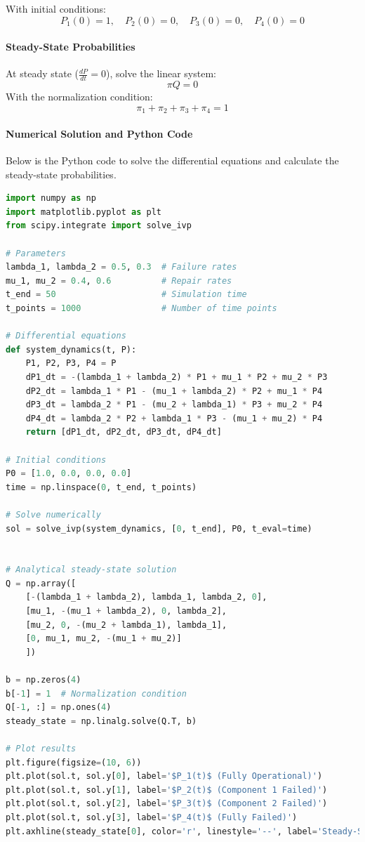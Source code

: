 \documentclass[a4paper,12pt]{article}
\begin{document}
\begin{answerbox}
	With initial conditions:
	\[
	P_1(0) = 1, \quad P_2(0) = 0, \quad P_3(0) = 0, \quad P_4(0) = 0
	\]
	
	\paragraph{Steady-State Probabilities}
	At steady state (\( \frac{dP}{dt} = 0 \)), solve the linear system:
	\[
	\pi Q = 0
	\]
	With the normalization condition:
	\[
	\pi_1 + \pi_2 + \pi_3 + \pi_4 = 1
	\]
\end{answerbox}



\begin{answerbox}
	\paragraph{Numerical Solution and Python Code}
	Below is the Python code to solve the differential equations and calculate the steady-state probabilities.
	
	
\begin{lstlisting}[language=Python]
import numpy as np
import matplotlib.pyplot as plt
from scipy.integrate import solve_ivp

# Parameters
lambda_1, lambda_2 = 0.5, 0.3  # Failure rates
mu_1, mu_2 = 0.4, 0.6          # Repair rates
t_end = 50                     # Simulation time
t_points = 1000                # Number of time points

# Differential equations
def system_dynamics(t, P):
	P1, P2, P3, P4 = P
	dP1_dt = -(lambda_1 + lambda_2) * P1 + mu_1 * P2 + mu_2 * P3
	dP2_dt = lambda_1 * P1 - (mu_1 + lambda_2) * P2 + mu_1 * P4
	dP3_dt = lambda_2 * P1 - (mu_2 + lambda_1) * P3 + mu_2 * P4
	dP4_dt = lambda_2 * P2 + lambda_1 * P3 - (mu_1 + mu_2) * P4
	return [dP1_dt, dP2_dt, dP3_dt, dP4_dt]

# Initial conditions
P0 = [1.0, 0.0, 0.0, 0.0]
time = np.linspace(0, t_end, t_points)

# Solve numerically
sol = solve_ivp(system_dynamics, [0, t_end], P0, t_eval=time)


# Analytical steady-state solution
Q = np.array([
	[-(lambda_1 + lambda_2), lambda_1, lambda_2, 0],
	[mu_1, -(mu_1 + lambda_2), 0, lambda_2],
	[mu_2, 0, -(mu_2 + lambda_1), lambda_1],
	[0, mu_1, mu_2, -(mu_1 + mu_2)]
	])
	
b = np.zeros(4)
b[-1] = 1  # Normalization condition
Q[-1, :] = np.ones(4)
steady_state = np.linalg.solve(Q.T, b)

# Plot results
plt.figure(figsize=(10, 6))
plt.plot(sol.t, sol.y[0], label='$P_1(t)$ (Fully Operational)')
plt.plot(sol.t, sol.y[1], label='$P_2(t)$ (Component 1 Failed)')
plt.plot(sol.t, sol.y[2], label='$P_3(t)$ (Component 2 Failed)')
plt.plot(sol.t, sol.y[3], label='$P_4(t)$ (Fully Failed)')
plt.axhline(steady_state[0], color='r', linestyle='--', label='Steady-State $\\pi_1$')


\end{lstlisting}
\end{answerbox}
\end{document}
